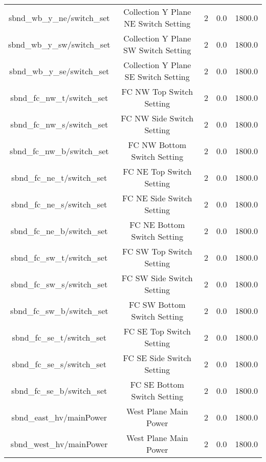 \begin{center}
\begin{longtable}{c | c c c c }
sbnd\_wb\_y\_ne/switch\_set & Collection Y Plane NE Switch Setting & 2 & 0.0 & 1800.0\\ 
sbnd\_wb\_y\_sw/switch\_set & Collection Y Plane SW Switch Setting & 2 & 0.0 & 1800.0\\ 
sbnd\_wb\_y\_se/switch\_set & Collection Y Plane SE Switch Setting & 2 & 0.0 & 1800.0\\ 
sbnd\_fc\_nw\_t/switch\_set & FC NW Top Switch Setting & 2 & 0.0 & 1800.0\\ 
sbnd\_fc\_nw\_s/switch\_set & FC NW Side Switch Setting & 2 & 0.0 & 1800.0\\ 
sbnd\_fc\_nw\_b/switch\_set & FC NW Bottom Switch Setting & 2 & 0.0 & 1800.0\\ 
sbnd\_fc\_ne\_t/switch\_set & FC NE Top Switch Setting & 2 & 0.0 & 1800.0\\ 
sbnd\_fc\_ne\_s/switch\_set & FC NE Side Switch Setting & 2 & 0.0 & 1800.0\\ 
sbnd\_fc\_ne\_b/switch\_set & FC NE Bottom Switch Setting & 2 & 0.0 & 1800.0\\ 
sbnd\_fc\_sw\_t/switch\_set & FC SW Top Switch Setting & 2 & 0.0 & 1800.0\\ 
sbnd\_fc\_sw\_s/switch\_set & FC SW Side Switch Setting & 2 & 0.0 & 1800.0\\ 
sbnd\_fc\_sw\_b/switch\_set & FC SW Bottom Switch Setting & 2 & 0.0 & 1800.0\\ 
sbnd\_fc\_se\_t/switch\_set & FC SE Top Switch Setting & 2 & 0.0 & 1800.0\\ 
sbnd\_fc\_se\_s/switch\_set & FC SE Side Switch Setting & 2 & 0.0 & 1800.0\\ 
sbnd\_fc\_se\_b/switch\_set & FC SE Bottom Switch Setting & 2 & 0.0 & 1800.0\\ 
sbnd\_east\_hv/mainPower & West Plane Main Power & 2 & 0.0 & 1800.0\\ 
sbnd\_west\_hv/mainPower & West Plane Main Power & 2 & 0.0 & 1800.0\\ 

\hline
\end{longtable}
\end{center}


